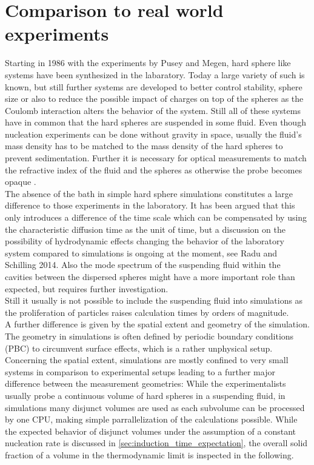\section{Comparison to real world experiments} 
\label{sec:comparison}

Starting in 1986 with the experiments by Pusey and Megen\cite{Pusey1986}, hard sphere like systems have been synthesized in the labaratory. Today a large variety of such is known, but still further systems are developed to better control stability, sphere size or also to reduce the possible impact of charges on top of the spheres as the Coulomb interaction alters the behavior of the system. Still all of these systems have in common that the hard spheres are suspended in some fluid. Even though nucleation experiments can be done without gravity in space\cite{Doherty1998}, usually the fluid's mass density has to be matched to the mass density of the hard spheres to prevent sedimentation. Further it is necessary for optical measurements to match the refractive index of the fluid and the spheres as otherwise the probe becomes opaque .\\

The absence of the bath in simple hard sphere simulations constitutes a large difference to those experiments in the laboratory. It has been argued that this only introduces a difference of the time scale which can be compensated by using the characteristic diffusion time as the unit of time, but a discussion on the possibility of hydrodynamic effects changing the behavior of the laboratory system compared to simulations is ongoing at the moment, see Radu and Schilling 2014\cite{Radu2014}.
Also the mode spectrum of the suspending fluid within the cavities between the dispersed spheres might have a more important role 
than expected, but requires further investigation.\\ 
Still it usually is not possible to include the suspending fluid into simulations as the proliferation of particles raises calculation times by orders of magnitude.\\

A further difference is given by the spatial extent and geometry of the simulation. The geometry in simulations is often defined by periodic boundary conditions (PBC) to circumvent surface effects, which is a rather unphysical setup.\\ 
Concerning the spatial extent, simulations are mostly confined to very small systems in comparison to experimental setups leading to a further major difference between the measurement geometries: While the experimentalists usually probe a continuous volume of hard spheres in a suspending fluid, in simulations many disjunct volumes are used as each subvolume can be processed by one CPU, making simple parrallelization of the calculations possible. While the expected behavior of disjunct volumes under the assumption of a constant nucleation rate is discussed in \autoref{sec:induction_time_expectation}, the overall solid fraction of a volume in the thermodynamic limit is inspected in the following.\\

